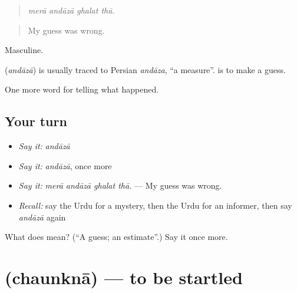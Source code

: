 \begin{quote}
   
\end{quote}

\begin{quote}
\emph{merā andāzā ghalat thā.}
\end{quote}

\begin{quote}
My guess was wrong.
\end{quote}

Masculine.

\begin{cousinweb}
\textbf{} (\emph{andāzā}) is usually traced to Persian \emph{andāza}, \textquotedblleft{}a measure\textquotedblright{}. \textbf{ } is to make a guess.
\end{cousinweb}

\begin{grammarlens}[title={What you've built}]
One more word for telling what happened.
\end{grammarlens}

\subsection*{Your turn}
\begin{itemize}
\raggedright
  \item \emph{Say it:} \emph{andāzā}
  \item \emph{Say it:} \emph{andāzā}, once more
  \item \emph{Say it:} \emph{merā andāzā ghalat thā.} — My guess was wrong.
  \item \emph{Recall:} say the Urdu for a mystery, then the Urdu for an informer, then say \emph{andāzā} again
\end{itemize}

\begin{tcolorbox}[breakable,colback=teal!4,colframe=teal!35!black,title={Before you move on}]
What does  mean? (\textquotedblleft{}A guess; an estimate\textquotedblright{}.) Say it once more.
\end{tcolorbox}
\section[\texorpdfstring{\ur{چونکنا} (chaunknā)}{چونکنا (chaunknā)}]{ (chaunknā) — to be startled}

\label{lesson:UR-C305-chaunkna}



